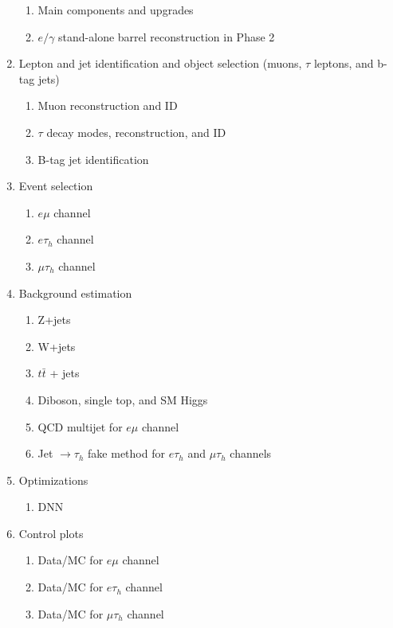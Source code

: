 \documentclass{article}
\begin{document}
\begin{enumerate}
\begin{enumerate}
            \item Main components and upgrades
            \item $e/\gamma$ stand-alone barrel reconstruction in Phase 2
        \end{enumerate}
    \item Lepton and jet identification and object selection (muons, $\tau$ leptons, and b-tag jets)
        \begin{enumerate}
            \item Muon reconstruction and ID 
            \item $\tau$ decay modes, reconstruction, and ID
            \item B-tag jet identification
        \end{enumerate}
    \item Event selection 
        \begin{enumerate}
            \item $e\mu$ channel
            \item $e\tau_{h}$ channel
            \item $\mu\tau_{h}$ channel
        \end{enumerate}
    \item Background estimation 
        \begin{enumerate}
            \item Z+jets
            \item W+jets
            \item $t\bar{t}$ + jets
            \item Diboson, single top, and SM Higgs
            \item QCD multijet for $e\mu$ channel
            \item Jet $\rightarrow \tau_{h}$ fake method for $e\tau_{h}$ and $\mu\tau_{h}$ channels
        \end{enumerate}
    \item Optimizations
        \begin{enumerate}
            \item DNN
        \end{enumerate}
    \item Control plots
        \begin{enumerate}
            \item Data/MC for $e\mu$ channel
            \item Data/MC for $e\tau_{h}$ channel
            \item Data/MC for $\mu\tau_{h}$ channel

\end{enumerate}
\end{enumerate}
\end{document}
